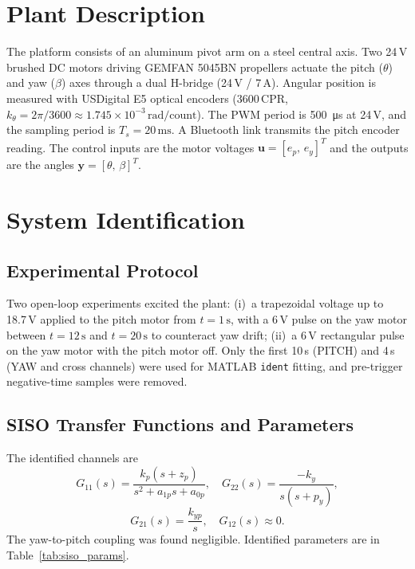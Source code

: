 \documentclass[conference]{IEEEtran}
\begin{document}
\section{Plant Description}
\label{sec:plant}

The platform consists of an aluminum pivot arm on a steel central axis. Two 24\,V brushed DC motors driving GEMFAN 5045BN propellers actuate the pitch ($\theta$) and yaw ($\beta$) axes through a dual H-bridge (24\,V / 7\,A). Angular position is measured with USDigital E5 optical encoders (3600\,CPR, $k_\theta = 2\pi/3600 \approx 1.745\!\times\!10^{-3}\,\text{rad/count}$). The PWM period is \SI{500}{\micro\second} at 24\,V, and the sampling period is $T_s = 20\,\text{ms}$. A Bluetooth link transmits the pitch encoder reading. The control inputs are the motor voltages $\mathbf{u} = [e_p,\, e_y]^T$ and the outputs are the angles $\mathbf{y} = [\theta,\, \beta]^T$.

\section{System Identification}
\label{sec:identification}

\subsection{Experimental Protocol}

Two open-loop experiments excited the plant: (i)~a trapezoidal voltage up to 18.7\,V applied to the pitch motor from $t=1\,\text{s}$, with a 6\,V pulse on the yaw motor between $t=12\,\text{s}$ and $t=20\,\text{s}$ to counteract yaw drift; (ii)~a 6\,V rectangular pulse on the yaw motor with the pitch motor off. Only the first 10\,s (PITCH) and 4\,s (YAW and cross channels) were used for MATLAB \texttt{ident} fitting, and pre-trigger negative-time samples were removed.

\subsection{SISO Transfer Functions and Parameters}

The identified channels are
\begin{equation}
G_{11}(s) = \frac{k_p(s + z_p)}{s^2 + a_{1p}s + a_{0p}}, \quad
G_{22}(s) = \frac{-k_y}{s(s + p_y)},
\end{equation}
\begin{equation}
G_{21}(s) = \frac{k_{yp}}{s}, \quad G_{12}(s) \approx 0.
\end{equation}
The yaw-to-pitch coupling was found negligible. Identified parameters are in Table~\ref{tab:siso_params}.
\end{document}
